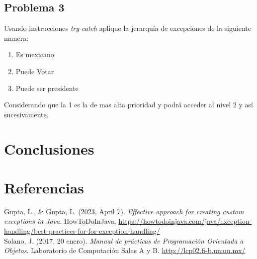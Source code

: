 \documentclass[11pt, twocolumn]{article}
\begin{document}
  \subsection*{Problema 3}
  Usando instrucciones \textit{try-catch} aplique la jerarquía de excepciones de la siguiente manera:

  \begin{enumerate}
    \item Es mexicano
    \item Puede Votar
    \item Puede ser presidente
  \end{enumerate}

  Considerando que la 1 es la de mas alta prioridad y podrá acceder al nivel 2 y así sucesivamente.


  \section*{Conclusiones}


  \section*{Referencias}
  \begin{small}
    Gupta, L., $\&$ Gupta, L. (2023, April 7). \textit{Effective approach for creating custom exceptions in Java}. HowToDoInJava. \url{https://howtodoinjava.com/java/exception-handling/best-practices-for-for-exception-handling/} \\

    Solano, J. (2017, 20 enero). \textit{Manual de prácticas de Programación Orientada a Objetos}. Laboratorio de Computación Salas A y B. \url{http://lcp02.fi-b.unam.mx/} \\
  \end{small}
\end{document}
